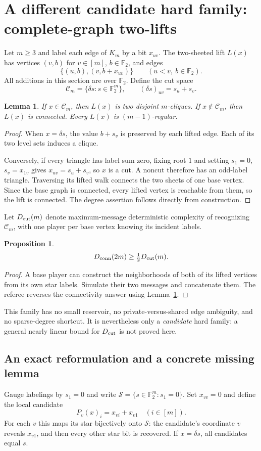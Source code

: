 \documentclass[11pt]{article}
\newtheorem{lemma}[theorem]{Lemma}
\newtheorem{proposition}[theorem]{Proposition}
\theoremstyle{definition}\newtheorem{definition}[theorem]{Definition}
\theoremstyle{remark}\newtheorem{remark}[theorem]{Remark}
\newcommand{\F}{\mathbb F}
\newcommand{\cut}{\mathcal C}
\begin{document}
\section{A different candidate hard family: complete-graph two-lifts}
Let $m\ge3$ and label each edge of $K_m$ by a bit $x_{uv}$. The two-sheeted lift $L(x)$ has vertices $(v,b)$ for $v\in[m]$, $b\in\F_2$, and edges
\[
 \{(u,b),(v,b+x_{uv})\}\qquad(u<v,\ b\in\F_2).
\]
All additions in this section are over $\F_2$. Define the cut space
\[
 \cut_m=\{\delta s:s\in\F_2^m\},
 \qquad (\delta s)_{uv}=s_u+s_v.
\]

\begin{lemma}\label{lem:lift}
If $x\in\cut_m$, then $L(x)$ is two disjoint $m$-cliques. If $x\notin\cut_m$, then $L(x)$ is connected. Every $L(x)$ is $(m-1)$-regular.
\end{lemma}
\begin{proof}
When $x=\delta s$, the value $b+s_v$ is preserved by each lifted edge. Each of its two level sets induces a clique.

Conversely, if every triangle has label sum zero, fixing root $1$ and setting $s_1=0$, $s_v=x_{1v}$ gives $x_{uv}=s_u+s_v$, so $x$ is a cut. A noncut therefore has an odd-label triangle. Traversing its lifted walk connects the two sheets of one base vertex. Since the base graph is connected, every lifted vertex is reachable from them, so the lift is connected. The degree assertion follows directly from construction.
\end{proof}

Let $D_{\rm cut}(m)$ denote maximum-message deterministic complexity of recognizing $\cut_m$, with one player per base vertex knowing its incident labels.
\begin{proposition}\label{prop:reduction}
\[
 D_{\rm conn}(2m)\ge\tfrac12D_{\rm cut}(m).
\]
\end{proposition}
\begin{proof}
A base player can construct the neighborhoods of both of its lifted vertices from its own star labels. Simulate their two messages and concatenate them. The referee reverses the connectivity answer using Lemma~\ref{lem:lift}.
\end{proof}
This family has no small reservoir, no private-versus-shared edge ambiguity, and no sparse-degree shortcut. It is nevertheless only a \emph{candidate} hard family: a general nearly linear bound for $D_{\rm cut}$ is not proved here.

\subsection{An exact reformulation and a concrete missing lemma}
Gauge labelings by $s_1=0$ and write $\mathcal S=\{s\in\F_2^m:s_1=0\}$. Set $x_{vv}=0$ and define the local candidate
\[
 P_v(x)_i=x_{vi}+x_{v1}\quad(i\in[m]).
\]
For each $v$ this maps its star bijectively onto $\mathcal S$: the candidate's coordinate $v$ reveals $x_{v1}$, and then every other star bit is recovered. If $x=\delta s$, all candidates equal $s$.
\end{document}
